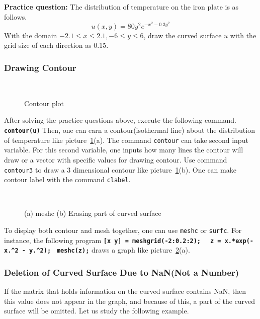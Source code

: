 \vn \textbf{Practice question:} The distribution of temperature on the iron plate is as follows.
$$u(x, y) = 80 y^{2} e^{-x^{2}-0.3y^{2}}$$ \noindent With the domain $-2.1 \leq x \leq 2.1, -6 \leq y \leq 6$, draw the curved surface $u$ with the grid size of each direction as 0.15.

\subsubsection{Drawing Contour}
\begin{figure}
\centering
\mbox{%
 \quad
{}} \caption{Contour
plot} \label{contour}
\end{figure}

After solving the practice questions above, execute the following command. \matlabp\texttt{\textbf{ contour(u)}} \vn Then, one can earn a contour(isothermal line) about the distribution of temperature like picture~\ref{contour}(a). The command {\tt contour} can take second input variable. For this second variable, one inputs how many lines the contour will draw or a vector with specific values for drawing contour. Use command {\tt contour3} to draw a 3 dimensional contour like picture~\ref{contour}(b). One can make contour label with the command {\tt clabel}.

\begin{figure}
\centering
\mbox{%
 \quad
{}} \caption{(a)
meshc \quad (b) Erasing part of curved surface} \label{meshc}
\end{figure}

\vv To display both contour and mesh together, one can use {\tt meshc} or {\tt surfc}. For instance, the following program \matlabp\texttt{\textbf{[x y] = meshgrid(-2:0.2:2); }} \matlabp\texttt{\textbf{ z = x.*exp(-x.\^{}2 - y.\^{}2); }} \matlabp\texttt{\textbf{meshc(z);}} \vn draws a graph like picture~\ref{meshc}(a).

\subsubsection{Deletion of Curved Surface Due to NaN(Not a Number)}
If the matrix that holds information on the curved surface contains NaN, then this value does not appear in the graph, and because of this, a part of the curved surface will be omitted. Let us study the following example.

